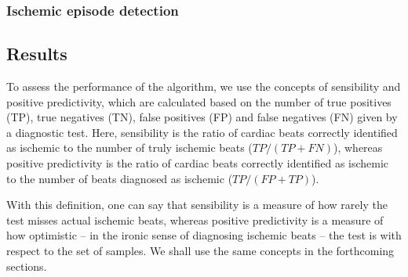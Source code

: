     \subsubsection{Ischemic episode detection}
    
\subsection{Results}
    To assess the performance of the algorithm, we use the concepts of sensibility and positive predictivity, which are calculated based on the number of true positives (TP), true negatives (TN), false positives (FP) and false negatives (FN) given by a diagnostic test. Here, sensibility is the ratio of cardiac beats correctly identified as ischemic to the number of truly ischemic beats ($TP/(TP+FN)$), whereas positive predictivity is the ratio of cardiac beats correctly identified as ischemic to the number of beats diagnosed as ischemic ($TP/(FP+TP)$).
    
    With this definition, one can say that sensibility is a measure of how rarely the test misses actual ischemic beats, whereas positive predictivity is a measure of how optimistic -- in the ironic sense of diagnosing ischemic beats -- the test is with respect to the set of samples. We shall use the same concepts in the forthcoming sections.
